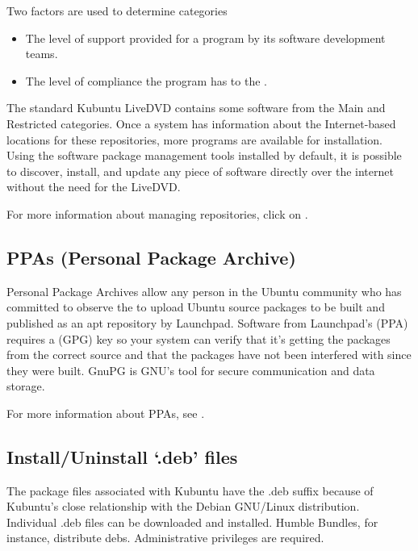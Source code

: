 \documentclass[letterpaper,10pt,english]{sphinxmanual}
\begin{document}
Two factors are used to determine categories
\begin{itemize}
\item {} 
The level of support provided for a program by its software development teams.

\item {} 
The level of compliance the program has to the .

\end{itemize}

The standard Kubuntu LiveDVD contains some software from the \sphinxquotedblleft{}Main\sphinxquotedblright{} and \sphinxquotedblleft{}Restricted\sphinxquotedblright{} categories. Once a system has information about the Internet-based locations for these repositories, more programs are available for installation. Using the software package management tools installed by default, it is possible to discover, install, and update any piece of software directly over the internet without the need for the LiveDVD.

For more information about managing repositories, click on .


\subsection{PPAs (Personal Package Archive)}
\label{\detokenize{docs/advanced:ppas-personal-package-archive}}
Personal Package Archives allow any person in the Ubuntu community who has committed to observe the  to upload Ubuntu source packages to be built and published as an apt repository by Launchpad. Software from Launchpad's  (PPA) requires a  (GPG) key so your system can verify that it's getting the packages from the correct source and that the packages have not been interfered with since they were built. GnuPG is GNU's tool for secure communication and data storage.

For more information about PPAs, see .


\subsection{Install/Uninstall `.deb' files}
\label{\detokenize{docs/advanced:install-uninstall-deb-files}}
The package files associated with Kubuntu have the \sphinxquotedblright{}.deb\sphinxquotedblright{} suffix because of Kubuntu's close relationship with the Debian GNU/Linux distribution. Individual \sphinxquotedblright{}.deb\sphinxquotedblright{} files can be downloaded and installed. Humble Bundles, for instance, distribute debs. Administrative privileges are required.
\end{document}
